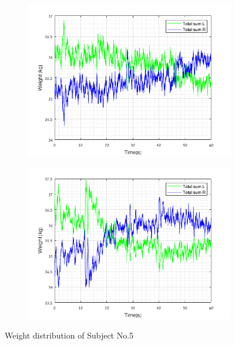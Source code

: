 \documentclass[twoside]{ctuthesis}
\theoremstyle{plain}
\theoremstyle{definition}
\theoremstyle{note}
\begin{document}
\begin{figure}[H]
	\centering
	\begin{subfigure}{\textwidth}
		\hspace*{-1cm}
		\includegraphics[scale=1]{W_sub5_OE}
	\end{subfigure}\hfil
	\begin{subfigure}{\textwidth}
		\hspace*{-1cm}
		\includegraphics[scale=1]{W_sub5_CE}
	\end{subfigure}
	\caption{Weight distribution of Subject No.5}
\end{figure}
\end{document}
